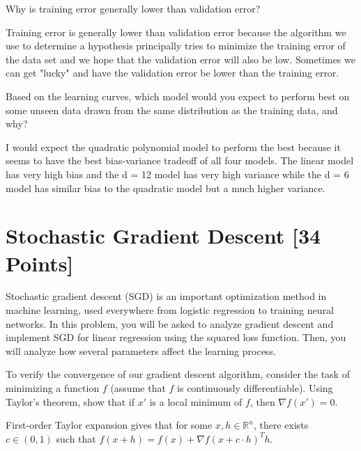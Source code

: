 \begin{problem}[3]
  Why is training error generally lower than validation error?
\end{problem}
\begin{solution}
  Training error is generally lower than validation error because the algorithm we use
  to determine a hypothesis principally tries to minimize the training error of the
  data set and we hope that the validation error will also be low. Sometimes we can
  get "lucky" and have the validation error be lower than the training error.
\end{solution}

\begin{problem}[3]
  Based on the learning curves, which model would you expect to perform best on some unseen data drawn from the same distribution as the training data, and why?
\end{problem}
\begin{solution}
  I would expect the quadratic polynomial model to perform the best because it seems to
  have the best bias-variance tradeoff of all four models. The linear model has very
  high bias and the d = 12 model has very high variance while the d = 6 model has 
  similar bias to the quadratic model but a much higher variance.
\end{solution}





\newpage
\section{Stochastic Gradient Descent [34 Points]}

Stochastic gradient descent (SGD) is an important optimization method in machine learning, used everywhere from logistic regression to training neural networks. In this problem, you will be asked to analyze gradient descent and implement SGD for linear regression using the squared loss function. Then, you will analyze how several parameters affect the learning process.

\begin{problem}[3]
    To verify the convergence of our gradient descent algorithm, consider the task of minimizing a function $f$ (assume that $f$ is continuously differentiable). Using Taylor's theorem, show that if $x'$ is a local minimum of $f$, then $\nabla f(x') = 0$. 
\end{problem}
\begin{hint}
  First-order Taylor expansion gives that for some $x, h \in \mathbb{R}^n$, there exists $c \in (0, 1)$ such that $f(x + h) = f(x) + \nabla f(x + c\cdot h)^T h$.
  
\end{hint}
\begin{solution}

\end{solution}

